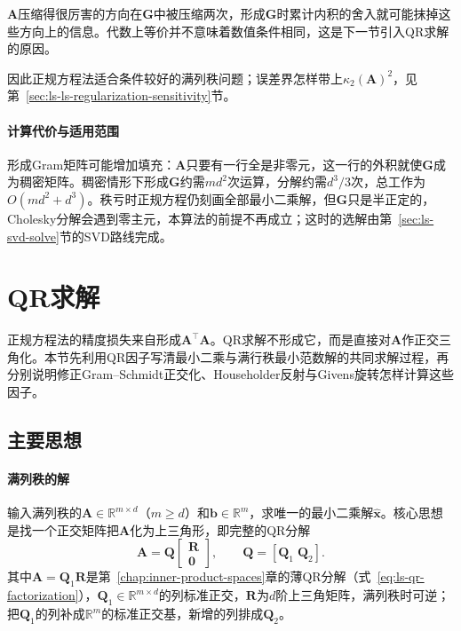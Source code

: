 $\bm A$压缩得很厉害的方向在$\bm G$中被压缩两次，形成$\bm G$时累计内积的舍入就可能抹掉这些方向上的信息。代数上等价并不意味着数值条件相同，这是下一节引入QR求解的原因。

因此正规方程法适合条件较好的满列秩问题；误差界怎样带上$\kappa_2(\bm A)^2$，见第~\ref{sec:ls-ls-regularization-sensitivity}节。

\paragraph{计算代价与适用范围}
形成Gram矩阵可能增加填充：$\bm A$只要有一行全是非零元，这一行的外积就使$\bm G$成为稠密矩阵。稠密情形下形成$\bm G$约需$md^2$次运算，分解约需$d^3/3$次，总工作为$O(md^2+d^3)$。秩亏时正规方程仍刻画全部最小二乘解，但$\bm G$只是半正定的，Cholesky分解会遇到零主元，本算法的前提不再成立；这时的选解由第~\ref{sec:ls-svd-solve}节的SVD路线完成。

\section{QR求解}
\label{sec:ls-qr-method}

正规方程法的精度损失来自形成$\bm A^\top\bm A$。QR求解不形成它，而是直接对$\bm A$作正交三角化。本节先利用QR因子写清最小二乘与满行秩最小范数解的共同求解过程，再分别说明修正Gram--Schmidt正交化、Householder反射与Givens旋转怎样计算这些因子。

\subsection{主要思想}
\paragraph{满列秩的解}
输入满列秩的$\bm A\in\mathbb R^{m\times d}$（$m\geq d$）和$\bm b\in\mathbb R^m$，求唯一的最小二乘解$\hat{\bm x}$。核心思想是找一个正交矩阵把$\bm A$化为上三角形，即完整的QR分解
\begin{equation}
 \bm A=\bm Q\begin{bmatrix}\bm R\\\bm0\end{bmatrix},\qquad \bm Q=[\bm Q_1\;\bm Q_2].
 \label{eq:ls-full-qr}
\end{equation}
其中$\bm A=\bm Q_1\bm R$是第~\ref{chap:inner-product-spaces}章的薄QR分解（式~\eqref{eq:ls-qr-factorization}），$\bm Q_1\in\mathbb R^{m\times d}$的列标准正交，$\bm R$为$d$阶上三角矩阵，满列秩时可逆；把$\bm Q_1$的列补成$\mathbb R^m$的标准正交基，新增的列排成$\bm Q_2$。

